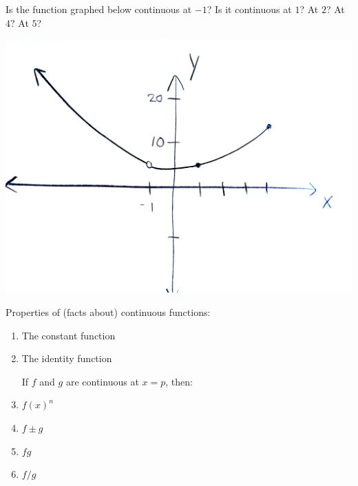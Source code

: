 \documentclass[12pt, a4paper]{article}
\begin{document}
\begin{ex}
  Is the function graphed below continuous at $-1$?  Is it continuous
  at $1$?  At $2$?  At $4$? At \(5\)?

  \includegraphics[scale=0.09]{images/cont-practice-inverted}
  \vspace{-2in}
\end{ex}
\begin{thrm}
  Properties of (facts about) continuous functions:
  \begin{enumerate}
    \item The constant function
    \item The identity function

    If $f$ and $g$ are continuous at $x=p$, then:
    \item $f(x)^n$
    \item $f \pm g$
    \item $fg$
    \item $f/g$
  \end{enumerate}
\end{thrm}
\end{document}
